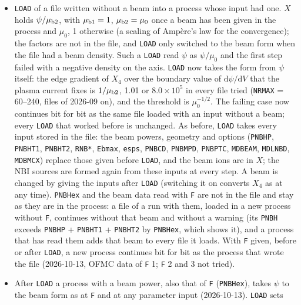 \documentclass[11pt]{article}
\def\r#1{{\rm#1}}
\begin{document}
\begin{itemize}
  converged; the stop message and the sweep report give \texttt{IC} = \texttt{ICMAX}, not
  \texttt{ICMAX} + 1.  The rule itself is set by \texttt{MDLNCA} (Sec.~\ref{sec:v552other}).
\item \texttt{LOAD} of a file written without a beam into a process whose input had one.  $X$ holds
  $\psi/\mu_\r{b2}$, with $\mu_\r{b1} = 1$, $\mu_\r{b2} = \mu_0$ once a beam has been given in the
  process and $\mu_0$, 1 otherwise (a scaling of Amp\`ere's law for the convergence); the factors are not
  in the file, and \texttt{LOAD} only switched to the beam form when the file had a beam density.  Such a
  \texttt{LOAD} read $\psi$ as $\psi/\mu_0$ and the first step failed with a negative density on the
  axis.  \texttt{LOAD} now takes the form from $\psi$ itself: the edge gradient of $X_4$ over the
  boundary value of $\mathrm{d}\psi/\mathrm{d}V$ that the plasma current fixes is $1/\mu_\r{b2}$, 1.01 or
  $8.0\times10^5$ in every file tried (\texttt{NRMAX} = 60--240, files of 2026-09 on), and the
  threshold is $\mu_0^{-1/2}$.  The failing
  case now continues bit for bit as the same file loaded with an input without a beam; every
  \texttt{LOAD} that worked before is unchanged.  As before, \texttt{LOAD} takes every input stored in
  the file: the beam powers, geometry and options (\texttt{PNBHP}, \texttt{PNBHT1}, \texttt{PNBHT2},
  \texttt{RNB*}, \texttt{Ebmax}, \texttt{esps}, \texttt{PNBCD}, \texttt{PNBMPD}, \texttt{PNBPTC},
  \texttt{MDBEAM}, \texttt{MDLNBD}, \texttt{MDBMCX}) replace those given before \texttt{LOAD}, and the
  beam ions are in $X$; the NBI sources are formed again from these inputs at every step.  A beam is
  changed by giving the inputs after \texttt{LOAD} (switching it on converts $X_4$ as at any
  time).  \texttt{PNBHex} and the beam data read with \texttt{F} are not in the file and stay as
  they are in the process: a file of a run with them, loaded in a new process without \texttt{F},
  continues without that beam and without a warning (its \texttt{PNBH} exceeds
  \texttt{PNBHP} + \texttt{PNBHT1} + \texttt{PNBHT2} by \texttt{PNBHex}, which shows it), and a process
  that has read them adds that beam to every file it loads.  With \texttt{F} given, before or after
  \texttt{LOAD}, a new process continues bit for bit as the process that wrote the file
  (2026-10-13, OFMC data of \texttt{F} 1; \texttt{F} 2 and 3 not tried).
\item After \texttt{LOAD} a process with a beam power, also that of \texttt{F} (\texttt{PNBHex}), takes
  $\psi$ to the beam form as at \texttt{F} and at any parameter input (2026-10-13).  \texttt{LOAD} sets

\end{itemize}
\end{document}
